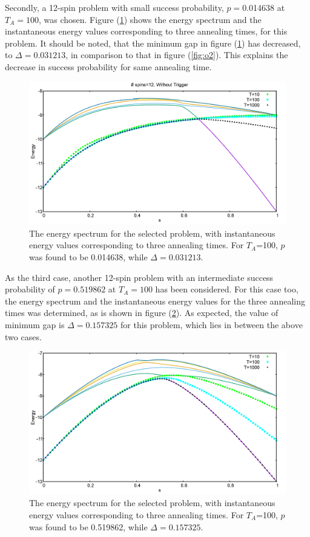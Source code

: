 \documentclass[12]{article}
\begin{document}
Secondly, a 12-spin problem with small success probability, $p= $0.014638 at $T_A=100$, was chosen. Figure (\ref{fig:o3}) shows the energy spectrum and the instantaneous energy values corresponding to three annealing times, for this problem. It should be noted, that the minimum gap in figure (\ref{fig:o3}) has decreased, to $\Delta = 0.031213$, in comparison to that in figure (\ref{fig:o2}). This explains the decrease in success probability for same annealing time.\\
\begin{figure}[H]
\centering 
\includegraphics[scale=0.3]{950_s12_O.png}
\caption{The energy spectrum for the selected problem, with instantaneous energy values corresponding to three annealing times. For $T_A$=100, $p$ was found to be 0.014638, while $\Delta=0.031213.$}
\label{fig:o3}
\end{figure}


As the third case, another 12-spin problem with an intermediate success probability of $p=0.519862$ at $T_A= 100$ has been considered. For this case too, the energy spectrum and the instantaneous energy values for the three annealing times was determined, as is shown in figure (\ref{fig:o4}). As expected, the value of minimum gap is $\Delta=0.157325$ for this problem, which lies in between the above two cases. 
\begin{figure}[H]
\centering 
\includegraphics[scale=0.3]{528_s12_O.png}
\caption{The energy spectrum for the selected problem, with instantaneous energy values corresponding to three annealing times. For $T_A$=100, $p$ was found to be 0.519862, while $\Delta=0.157325.$}
\label{fig:o4}
\end{figure}
\end{document}
